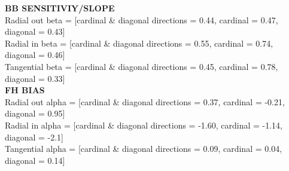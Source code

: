 \documentclass[11pt]{article} %
\begin{document}
\textbf{BB SENSITIVIY/SLOPE}
\\
Radial out beta = [cardinal \& diagonal directions =  0.44, cardinal = 0.47, diagonal = 0.43]
\\
Radial in beta = [cardinal \& diagonal directions =  0.55, cardinal = 0.74, diagonal = 0.46]
\\
Tangential beta = [cardinal \& diagonal directions =  0.45, cardinal = 0.78, diagonal = 0.33]
\\
\textbf{FH BIAS}
\\
Radial out alpha = [cardinal \& diagonal directions =  0.37, cardinal = -0.21, diagonal = 0.95]
\\
Radial in alpha = [cardinal \& diagonal directions =  -1.60, cardinal = -1.14, diagonal = -2.1]
\\
Tangential alpha = [cardinal \& diagonal directions =  0.09, cardinal = 0.04, diagonal = 0.14]

\newpage
\end{document}
